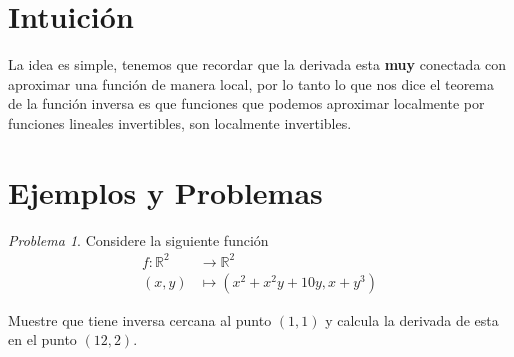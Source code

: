 \documentclass[a4paper,oneside,10.5pt]{article}
\newcommand\RR{\mathbb{R}}
\theoremstyle{definition}
\theoremstyle{plain}
\theoremstyle{remark}
\theoremstyle{theorem}
\newtheorem{prob}{Problema}
\begin{document}
\section*{Intuición}
La idea es simple, tenemos que recordar que la derivada esta \textbf{muy} conectada con aproximar una función de manera local, por lo tanto lo que nos dice el teorema de la función inversa es que funciones que podemos aproximar localmente por funciones lineales invertibles, son localmente invertibles.

\section*{Ejemplos y Problemas}
\begin{prob}
Considere la siguiente función
\begin{align*}
    f : \RR^2 &\to \RR^2\\
    (x, y) &\mapsto (x^2 + x^2y + 10y, x + y^3)
\end{align*}

Muestre que tiene inversa cercana al punto $(1,1)$ y calcula la derivada de esta en el punto $(12, 2)$.
\end{prob}
\end{document}
